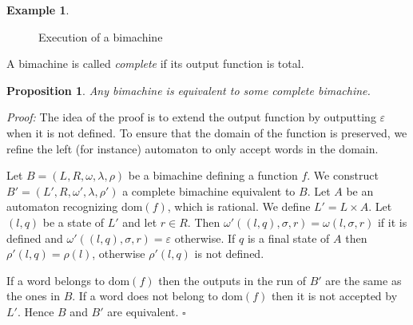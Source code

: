 \documentclass[12pt]{report}
\newtheorem{prp}{Proposition}[section]
\theoremstyle{definition}
\newtheorem{xmp}{Example}[section]
\theoremstyle{remark}
\newenvironment{prf}
{\textit{Proof:}}
{\hfill $\square$\\}
\begin{document}
\begin{xmp}
\begin{figure}[t]
\caption{Execution of a bimachine}
\label{exe}
\end{figure}
\end{xmp}
A bimachine is called \emph{complete} if its output function is total.
\begin{prp}
\label{complete}
Any bimachine is equivalent to some complete bimachine.
\end{prp}

\begin{prf}
The idea of the proof is to extend the output function by outputting $\varepsilon$ when it is not defined. To ensure that the domain of the function is preserved, we refine the left (for instance) automaton to only accept words in the domain.

Let $B=(L,R,\omega,\lambda,\rho)$ be a bimachine defining a function $f$. We construct $B'=(L',R,\omega',\lambda,\rho')$ a complete bimachine equivalent to $B$.
Let $A$ be an automaton recognizing $\mathrm{dom}(f)$, which is rational.
We define $L'=L\times A$.
Let $(l,q)$ be a state of $L'$ and let $r\in R$. Then $\omega'((l,q),\sigma,r)=\omega(l,\sigma,r)$ if it is defined and $\omega'((l,q),\sigma,r)=\varepsilon$ otherwise.
If $q$ is a final state of $A$ then $\rho'(l,q)=\rho(l)$, otherwise $\rho'(l,q)$ is not defined.

If a word belongs to $\mathrm{dom}(f)$ then the outputs in the run of $B'$ are the same as the ones in $B$. If a word does not belong to $\mathrm{dom}(f)$ then it is not accepted by $L'$.
Hence $B$ and $B'$ are equivalent.
\end{prf}
\end{document}
